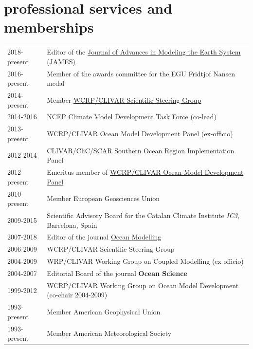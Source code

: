 \documentclass{article}
\begin{document}
\section*{\sc  \color{Maroon}  professional services and memberships}
\vspace{-.25cm}

\begin{tabular}{ll}
2018-present & Editor of the  \href{http://agupubs.onlinelibrary.wiley.com/hub/journal/10.1002/(ISSN)1942-2466/editorial-board/editorial-board.html}{Journal of Advances in Modeling the Earth System (JAMES)}  \\
  2016-present & Member of the awards committee for the EGU Fridtjof Nansen medal 
  \\
2014-present &  Member  \href{http://www.clivar.org/organization/ssg}{WCRP/CLIVAR Scientific Steering Group} \\
2014-2016     & NCEP Climate Model Development Task Force (co-lead) \\
2013-present & \href{http://www.clivar.org/clivar-panels/omdp}{WCRP/CLIVAR Ocean Model Development Panel (ex-officio)} \\
2012-2014     & CLIVAR/CliC/SCAR Southern Ocean Region Implementation Panel \\
2012-present & Emeritus member of \href{http://www.clivar.org/clivar-panels/omdp}{WCRP/CLIVAR Ocean Model Development Panel} \\
2010-present & Member European Geosciences Union \\
2009-2015     &  Scientific Advisory Board for the Catalan  Climate Institute {\it IC3}, Barcelona, Spain \\
2007-2018 & Editor of the journal \href{https://www.journals.elsevier.com/ocean-modelling/editorial-board}{Ocean Modelling}  \\
2006-2009     &  WCRP/CLIVAR Scientific Steering Group \\
2004-2009     &  WRP/CLIVAR Working Group on Coupled Modelling (ex officio) \\
2004-2007     & Editorial Board of the journal {\bf Ocean Science} \\
1999-2012     & WCRP/CLIVAR Working Group on Ocean Model Development  (co-chair 2004-2009) \\
1993-present  & Member American Geophysical Union \\
1993-present  & Member American Meteorological Society \\
\end{tabular}
\end{document}
